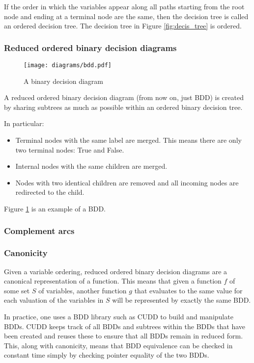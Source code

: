 If the order in which the variables appear along all paths starting from the root node and ending at a terminal node are the same, then the decision tree is called an ordered decision tree. The decision tree in Figure \ref{fig:decis_tree} is ordered.

\subsubsection{Reduced ordered binary decision diagrams}

\begin{figure}[t]
\centering
\texttt{[image: diagrams/bdd.pdf]}
\caption{A binary decision diagram}
\label{fig:bdd}
\end{figure}

A reduced ordered binary decision diagram (from now on, just BDD) is created by sharing subtrees as much as possible within an ordered binary decision tree.

In particular: 
\begin{itemize}
    \item Terminal nodes with the same label are merged. This means there are only two terminal nodes: True and False.
    \item Internal nodes with the same children are merged.
    \item Nodes with two identical children are removed and all incoming nodes are redirected to the child.
\end{itemize}

Figure \ref{fig:bdd} is an example of a BDD.

\subsubsection{Complement arcs}

\subsubsection{Canonicity}
Given a variable ordering, reduced ordered binary decision diagrams are a canonical representation of a function. This means that given a function $f$ of some set $S$ of variables, another function $g$ that evaluates to the same value for each valuation of the variables in $S$ will be represented by exactly the same BDD.

In practice, one uses a BDD library such as CUDD \cite{cudd} to build and manipulate BDDs. CUDD keeps track of all BDDs and subtrees within the BDDs that have been created and reuses these to ensure that all BDDs remain in reduced form. This, along with canonicity, means that BDD equivalence can be checked in constant time simply by checking pointer equality of the two BDDs.

